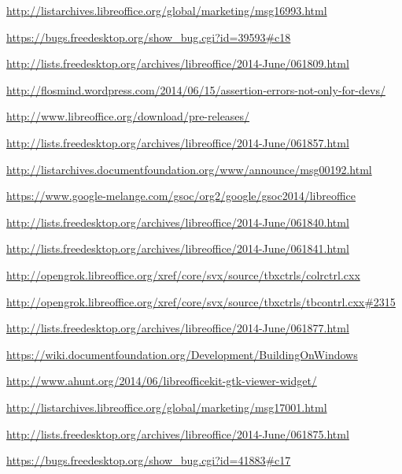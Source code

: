 \documentclass{article}
\begin{document}
\begin{thebibliography}{30}
    \url{http://listarchives.libreoffice.org/global/marketing/msg16993.html}

    \url{https://bugs.freedesktop.org/show_bug.cgi?id=39593#c18}

    \url{http://lists.freedesktop.org/archives/libreoffice/2014-June/061809.html}

    \url{http://flosmind.wordpress.com/2014/06/15/assertion-errors-not-only-for-devs/}

    \url{http://www.libreoffice.org/download/pre-releases/}

    \url{http://lists.freedesktop.org/archives/libreoffice/2014-June/061857.html}

    \url{http://listarchives.documentfoundation.org/www/announce/msg00192.html}

    \url{https://www.google-melange.com/gsoc/org2/google/gsoc2014/libreoffice}

    \url{http://lists.freedesktop.org/archives/libreoffice/2014-June/061840.html}

    \url{http://lists.freedesktop.org/archives/libreoffice/2014-June/061841.html}

    \url{http://opengrok.libreoffice.org/xref/core/svx/source/tbxctrls/colrctrl.cxx}

    \url{http://opengrok.libreoffice.org/xref/core/svx/source/tbxctrls/tbcontrl.cxx#2315}

    \url{http://lists.freedesktop.org/archives/libreoffice/2014-June/061877.html}

    \url{https://wiki.documentfoundation.org/Development/BuildingOnWindows}

    \url{http://www.ahunt.org/2014/06/libreofficekit-gtk-viewer-widget/}

    \url{http://listarchives.libreoffice.org/global/marketing/msg17001.html}

    \url{http://lists.freedesktop.org/archives/libreoffice/2014-June/061875.html}

    \url{https://bugs.freedesktop.org/show_bug.cgi?id=41883#c17}


\end{thebibliography}
\end{document}
